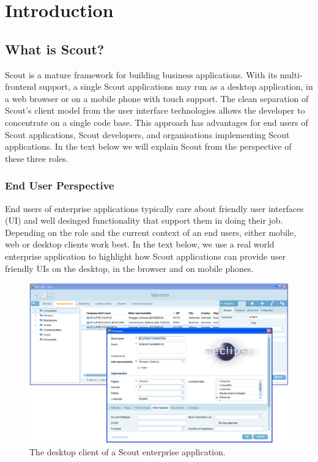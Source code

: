 \documentclass[a4paper,10pt,twoside]{book}
\begin{document}
  \sloppy
\fi


\chapter{Introduction}

\section{What is Scout?}

Scout is a mature framework for building business applications. 
With its multi-frontend support, a single Scout applications may run as a desktop application, in a web browser or on a mobile phone with touch support. 
The clean separation of Scout's client model from the user interface technologies allows the developer to concentrate on a single code base. 
This approach has advantages for end users of Scout applications, Scout developers, and organisations implementing Scout applications.
In the text below we will explain Scout from the perspective of these three roles.

\subsection{End User Perspective}

End users of enterprise applications typically care about friendly user interfaces (UI) and well desinged functionality that support them in doing their job.
Depending on the role and the current context of an end users, either mobile, web or desktop clients work best.
In the text below, we use a real world enterprise application to highlight how Scout applications can provide user friendly UIs on the desktop, in the browser and on mobile phones.

\begin{figure}
\includegraphics[width=14cm]{bsi_crm_desktop.png}
\caption{The desktop client of a Scout enterprise application.}
\end{figure}
\end{document}

